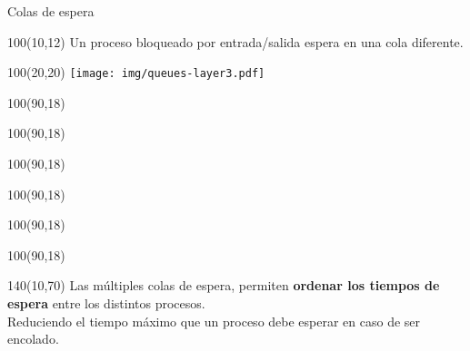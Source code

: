 \documentclass[aspectratio=169]{beamer}
\begin{document}
\begin{frame}{Colas de espera}
    \begin{textblock}{100}(10,12)
    \small
    Un proceso bloqueado por entrada/salida espera en una cola diferente.
    \end{textblock}
    \begin{textblock}{100}(20,20)
    \texttt{[image: img/queues-layer3.pdf]}
    \end{textblock}
    \begin{textblock}{100}(90,18)  \end{textblock} %
    \begin{textblock}{100}(90,18)  \end{textblock} %
    \begin{textblock}{100}(90,18)  \end{textblock} %
    \begin{textblock}{100}(90,18)  \end{textblock} %
    \begin{textblock}{100}(90,18)  \end{textblock} %
    \begin{textblock}{100}(90,18)  \end{textblock} %
    \begin{textblock}{140}(10,70)
    \small
    Las múltiples colas de espera, permiten \textbf{ordenar los tiempos de espera} entre los distintos procesos.\\
    Reduciendo el tiempo máximo que un proceso debe esperar en caso de ser encolado.
    \end{textblock}
\end{frame}
\end{document}

